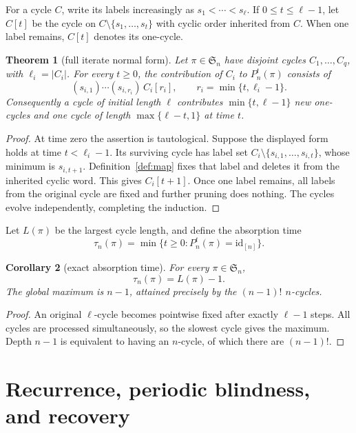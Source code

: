 \documentclass[11pt,a4paper]{amsart}
\newtheorem{theorem}{Theorem}[section]
\newtheorem{corollary}[theorem]{Corollary}
\theoremstyle{definition}
\theoremstyle{remark}
\newcommand{\Sn}{\mathfrak S_n}
\newcommand{\id}{\mathrm{id}}
\newcommand{\card}[1]{\lvert #1\rvert}
\begin{document}
For a cycle $C$, write its labels increasingly as
$s_1<\cdots<s_\ell$.  If $0\leq t\leq\ell-1$, let $C[t]$ be the cycle on
$C\setminus\{s_1,\ldots,s_t\}$ with cyclic order inherited from $C$.
When one label remains, $C[t]$ denotes its one-cycle.

\begin{theorem}[full iterate normal form]\label{thm:iterate}
Let $\pi\in\Sn$ have disjoint cycles $C_1,\ldots,C_q$, with
$\ell_i=\card{C_i}$.  For every $t\geq0$, the contribution of $C_i$ to
$P_n^t(\pi)$ consists of
\[
 (s_{i,1})\cdots(s_{i,r_i})\,C_i[r_i],
 \qquad r_i=\min\{t,\ell_i-1\}.
\]
Consequently a cycle of initial length $\ell$ contributes
$\min\{t,\ell-1\}$ new one-cycles and one cycle of length
$\max\{\ell-t,1\}$ at time $t$.
\end{theorem}

\begin{proof}
At time zero the assertion is tautological.  Suppose the displayed form
holds at time $t<\ell_i-1$.  Its surviving cycle has label set
$C_i\setminus\{s_{i,1},\ldots,s_{i,t}\}$, whose minimum is
$s_{i,t+1}$.  Definition~\ref{def:map} fixes that label and deletes it from
the inherited cyclic word.  This gives $C_i[t+1]$.  Once one label remains,
all labels from the original cycle are fixed and further pruning does
nothing.  The cycles evolve independently, completing the induction.
\end{proof}

Let $L(\pi)$ be the largest cycle length, and define the absorption time
\[
 \tau_n(\pi)=\min\{t\geq0:P_n^t(\pi)=\id_{[n]}\}.
\]

\begin{corollary}[exact absorption time]\label{cor:depth}
For every $\pi\in\Sn$,
\[
 \boxed{\tau_n(\pi)=L(\pi)-1.}
\]
The global maximum is $n-1$, attained precisely by the $(n-1)!$
$n$-cycles.
\end{corollary}

\begin{proof}
An original $\ell$-cycle becomes pointwise fixed after exactly $\ell-1$
steps.  All cycles are processed simultaneously, so the slowest cycle gives
the maximum.  Depth $n-1$ is equivalent to having an $n$-cycle, of which
there are $(n-1)!$.
\end{proof}

\section{Recurrence, periodic blindness, and recovery}\label{sec:periodic}
\end{document}
